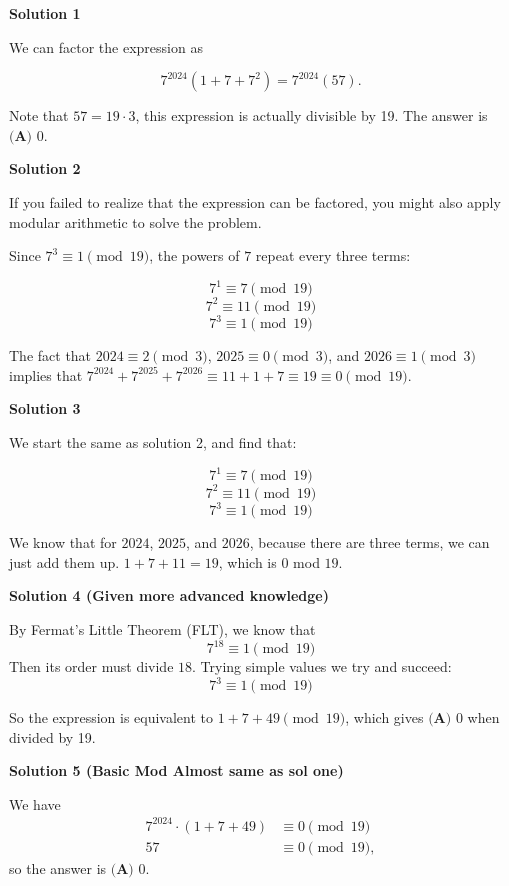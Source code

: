 \begin{enumerate}
\textbf{Solution 1}

We can factor the expression as

 
 \[7^{2024} (1 + 7 + 7^2) = 7^{2024} (57).\]

 Note that $57=19\cdot3$, this expression is actually divisible by 19. The answer is $\boxed{\textbf{(A) } 0}$.

 



\textbf{Solution 2}

If you failed to realize that the expression can be factored, you might also apply modular arithmetic to solve the problem.

 Since $7^3\equiv1\pmod{19}$, the powers of $7$ repeat every three terms:

 
 \[7^1\equiv7\pmod{19}\]
 \[7^2\equiv11\pmod{19}\]
 \[7^3\equiv1\pmod{19}\]

 The fact that $2024\equiv2\pmod3$, $2025\equiv0\pmod3$, and $2026\equiv1\pmod3$ implies that $7^{2024}+7^{2025}+7^{2026}\equiv11+1+7\equiv19 \equiv0\pmod{19}$.

 



\textbf{Solution 3}

We start the same as solution 2, and find that:

 
 \[7^1\equiv7\pmod{19}\]
 \[7^2\equiv11\pmod{19}\]
 \[7^3\equiv1\pmod{19}\]

 We know that for $2024$, $2025$, and $2026$, because there are three terms, we can just add them up. $1 + 7 + 11 = 19$, which is $0$ mod $19$. 

 


 



\textbf{Solution 4 (Given more advanced knowledge)}

By Fermat's Little Theorem (FLT), we know that 
 \[7^{18}\equiv1\pmod{19}\] Then its order must divide $18$. Trying simple values we try and succeed: 
 \[7^3\equiv1\pmod{19}\]

 
So the expression is equivalent to $1+7+49\pmod{19}$, which gives $\boxed{\textbf{(A) } 0}$ when divided by 19.

 



\textbf{Solution 5 (Basic Mod Almost same as sol one)}

We have \begin{align*}7^{2024} \cdot (1+7+49) &\equiv 0 \pmod{19}\\ 57 &\equiv 0 \pmod{19},\end{align*}
 so the answer is $\boxed{\textbf{(A) } 0}$. 


\end{enumerate}
